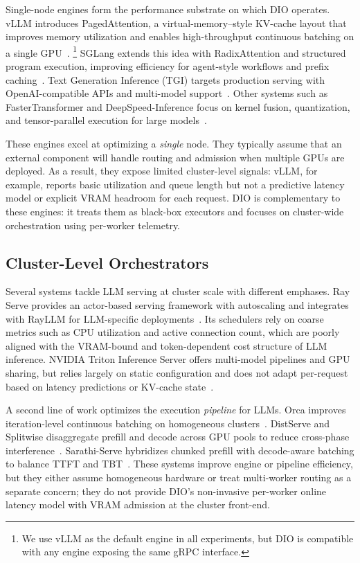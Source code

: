\documentclass[10pt,twocolumn,letterpaper]{article}
\begin{document}
Single-node engines form the performance substrate on which DIO operates.
vLLM introduces PagedAttention, a virtual-memory--style KV-cache layout that improves memory utilization and enables high-throughput continuous batching on a single GPU~\cite{vllm}.%
\footnote{We use vLLM as the default engine in all experiments, but DIO is compatible with any engine exposing the same gRPC interface.}
SGLang extends this idea with RadixAttention and structured program execution, improving efficiency for agent-style workflows and prefix caching~\cite{sglang}.
Text Generation Inference (TGI) targets production serving with OpenAI-compatible APIs and multi-model support~\cite{tgi}.
Other systems such as FasterTransformer and DeepSpeed-Inference focus on kernel fusion, quantization, and tensor-parallel execution for large models~\cite{fastertransformer,deepspeed}.

These engines excel at optimizing a \emph{single} node.
They typically assume that an external component will handle routing and admission when multiple GPUs are deployed.
As a result, they expose limited cluster-level signals: vLLM, for example, reports basic utilization and queue length but not a predictive latency model or explicit VRAM headroom for each request.
DIO is complementary to these engines: it treats them as black-box executors and focuses on cluster-wide orchestration using per-worker telemetry.

\subsection{Cluster-Level Orchestrators}

Several systems tackle LLM serving at cluster scale with different emphases.
Ray Serve provides an actor-based serving framework with autoscaling and integrates with RayLLM for LLM-specific deployments~\cite{rayserve,rayllm}.
Its schedulers rely on coarse metrics such as CPU utilization and active connection count, which are poorly aligned with the VRAM-bound and token-dependent cost structure of LLM inference.
NVIDIA Triton Inference Server offers multi-model pipelines and GPU sharing, but relies largely on static configuration and does not adapt per-request based on latency predictions or KV-cache state~\cite{triton}.

A second line of work optimizes the execution \emph{pipeline} for LLMs.
Orca improves iteration-level continuous batching on homogeneous clusters~\cite{orca}.
DistServe and Splitwise disaggregate prefill and decode across GPU pools to reduce cross-phase interference~\cite{distserve,splitwise}.
Sarathi-Serve hybridizes chunked prefill with decode-aware batching to balance TTFT and TBT~\cite{bullet}.
These systems improve engine or pipeline efficiency, but they either assume homogeneous hardware or treat multi-worker routing as a separate concern; they do not provide DIO's non-invasive per-worker online latency model with VRAM admission at the cluster front-end.
\end{document}
